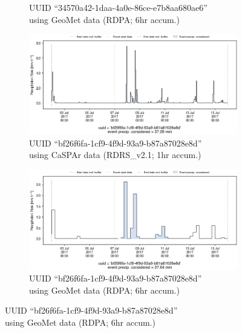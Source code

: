 \documentclass[10pt,a4paper,titlepage,parskip]{scrartcl}
\begin{document}
\begin{figure}[h!]
\begin{subfigure}[a]{0.48\textwidth}
		\caption{UUID ``34570a42-1daa-4a0e-86ce-e7b8aa680ae6''\\using GeoMet data (RDPA; 6hr accum.)}
	\end{subfigure}
	\par\bigskip\bigskip
	\begin{subfigure}[b]{0.48\textwidth}
		\centering
		\includegraphics[width=\linewidth]{figures/compare_Geomet_CaSPAr/interpolated_at_stations_occurrence_1362_identified-timesteps_RDRS_v2.1.png}
		\caption{UUID ``bf26f6fa-1cf9-4f9d-93a9-b87a87028e8d''\\using CaSPAr data (RDRS\_v2.1; 1hr accum.)}
	\end{subfigure}
	\hspace*{0.05\linewidth}
	\begin{subfigure}[b]{0.48\textwidth}
		\centering
		\includegraphics[width=\linewidth]{figures/compare_Geomet_CaSPAr/interpolated_at_stations_occurrence_1362_identified-timesteps_rdpa_10km_6f.png}
		\caption{UUID ``bf26f6fa-1cf9-4f9d-93a9-b87a87028e8d''\\using GeoMet data (RDPA; 6hr accum.)}
	\end{subfigure}
	\par\bigskip\bigskip

\end{figure}
\end{document}
